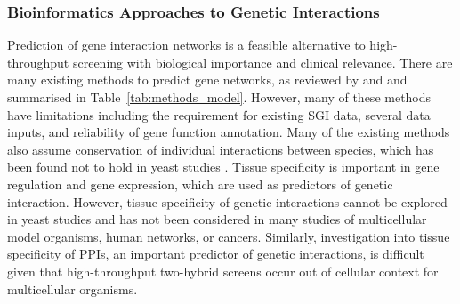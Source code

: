 \subsubsection{Bioinformatics Approaches to Genetic Interactions}

Prediction of gene interaction networks is a feasible alternative to high-throughput screening with biological importance and clinical relevance. There are many existing methods to predict gene networks, as reviewed by \citet{vanSteen2011} and \citet{Boucher2013} and summarised in Table~\ref{tab:methods_model}. However, many of these methods have limitations including the requirement for existing \gls{SGI} data, several data inputs, and reliability of gene function annotation. Many of the existing methods also assume conservation of individual interactions between species, which has been found not to hold in yeast studies \citep{Dixon2008}. Tissue specificity is important in gene regulation and \gls{gene expression}, which are used as predictors of genetic interaction. However, tissue specificity of genetic interactions cannot be explored in yeast studies and has not been considered in many studies of multicellular model organisms, human networks, or cancers. Similarly, investigation into tissue specificity of \glspl{PPI}, an important predictor of genetic interactions, is difficult given that high-throughput two-hybrid screens occur out of cellular context for multicellular organisms.  

